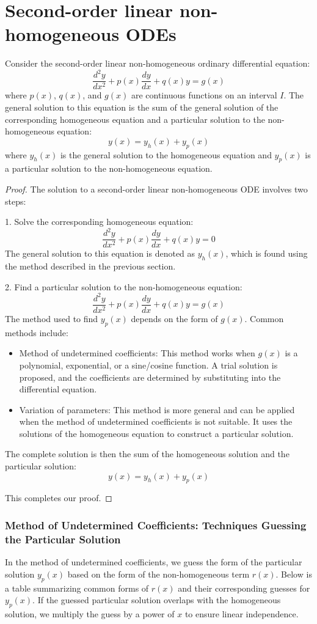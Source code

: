 \section{Second-order linear non-homogeneous ODEs}
\begin{theorem}
Consider the second-order linear non-homogeneous ordinary differential equation:
\[
\frac{d^2 y}{dx^2} + p(x)\frac{dy}{dx} + q(x)y = g(x)
\]
where $p(x)$, $q(x)$, and $g(x)$ are continuous functions on an interval $I$. The general solution to this equation is the sum of the general solution of the corresponding homogeneous equation and a particular solution to the non-homogeneous equation:
\[
y(x) = y_h(x) + y_p(x)
\]
where $y_h(x)$ is the general solution to the homogeneous equation and $y_p(x)$ is a particular solution to the non-homogeneous equation.
\end{theorem}

\begin{proof}
The solution to a second-order linear non-homogeneous ODE involves two steps:

1. Solve the corresponding homogeneous equation:
\[
\frac{d^2 y}{dx^2} + p(x)\frac{dy}{dx} + q(x)y = 0
\]
The general solution to this equation is denoted as $y_h(x)$, which is found using the method described in the previous section.

2. Find a particular solution to the non-homogeneous equation:
\[
\frac{d^2 y}{dx^2} + p(x)\frac{dy}{dx} + q(x)y = g(x)
\]
The method used to find $y_p(x)$ depends on the form of $g(x)$. Common methods include:
\begin{itemize}
    \item Method of undetermined coefficients: This method works when $g(x)$ is a polynomial, exponential, or a sine/cosine function. A trial solution is proposed, and the coefficients are determined by substituting into the differential equation.
    \item Variation of parameters: This method is more general and can be applied when the method of undetermined coefficients is not suitable. It uses the solutions of the homogeneous equation to construct a particular solution.
\end{itemize}

The complete solution is then the sum of the homogeneous solution and the particular solution:
\[
y(x) = y_h(x) + y_p(x)
\]

This completes our proof.
\end{proof}
\subsubsection*{Method of Undetermined Coefficients: Techniques Guessing the Particular Solution}
In the method of undetermined coefficients, we guess the form of the particular solution \( y_p(x) \) based on the form of the non-homogeneous term \( r(x) \). Below is a table summarizing common forms of \( r(x) \) and their corresponding guesses for \( y_p(x) \). If the guessed particular solution overlaps with the homogeneous solution, we multiply the guess by a power of \( x \) to ensure linear independence.

